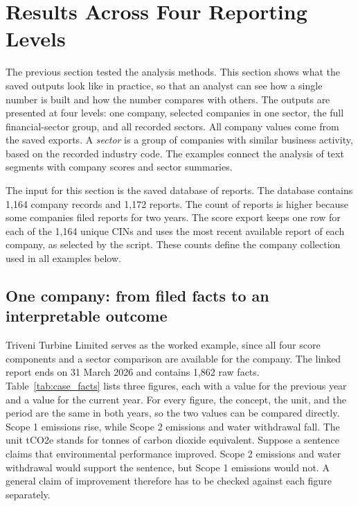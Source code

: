 \section{Results Across Four Reporting Levels}
\label{sec:results}

The previous section tested the analysis methods. This section shows what the saved outputs look like in practice, so that an analyst can see how a single number is built and how the number compares with others. The outputs are presented at four levels: one company, selected companies in one sector, the full financial-sector group, and all recorded sectors. All company values come from the saved exports. A \emph{sector} is a group of companies with similar business activity, based on the recorded industry code. The examples connect the analysis of text segments with company scores and sector summaries.

The input for this section is the saved database of reports. The database contains 1,164 company records and 1,172 reports. The count of reports is higher because some companies filed reports for two years. The score export keeps one row for each of the 1,164 unique CINs and uses the most recent available report of each company, as selected by the script. These counts define the company collection used in all examples below.

\subsection{One company: from filed facts to an interpretable outcome}
\label{sec:case}

Triveni Turbine Limited serves as the worked example, since all four score components and a sector comparison are available for the company. The linked report ends on 31 March 2026 and contains 1,862 raw facts. Table~\ref{tab:case_facts} lists three figures, each with a value for the previous year and a value for the current year. For every figure, the concept, the unit, and the period are the same in both years, so the two values can be compared directly. Scope 1 emissions rise, while Scope 2 emissions and water withdrawal fall. The unit tCO2e stands for tonnes of carbon dioxide equivalent. Suppose a sentence claims that environmental performance improved. Scope 2 emissions and water withdrawal would support the sentence, but Scope 1 emissions would not. A general claim of improvement therefore has to be checked against each figure separately.

